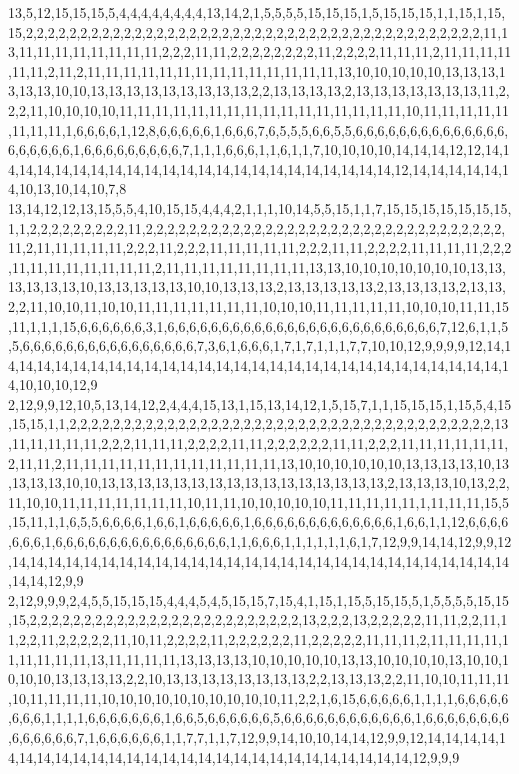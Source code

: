 13,5,12,15,15,15,5,4,4,4,4,4,4,4,4,13,14,2,1,5,5,5,5,15,15,15,1,5,15,15,15,1,1,15,1,15,15,2,2,2,2,2,2,2,2,2,2,2,2,2,2,2,2,2,2,2,2,2,2,2,2,2,2,2,2,2,2,2,2,2,2,2,2,2,2,2,2,2,2,11,13,11,11,11,11,11,11,11,11,2,2,2,11,11,2,2,2,2,2,2,2,2,11,2,2,2,2,11,11,11,2,11,11,11,11,11,11,2,11,2,11,11,11,11,11,11,11,11,11,11,11,11,11,11,13,10,10,10,10,10,13,13,13,13,13,13,10,10,13,13,13,13,13,13,13,13,13,2,2,13,13,13,13,2,13,13,13,13,13,13,13,11,2,2,2,11,10,10,10,10,11,11,11,11,11,11,11,11,11,11,11,11,11,11,11,11,10,11,11,11,11,11,11,11,11,1,6,6,6,6,1,12,8,6,6,6,6,6,1,6,6,6,7,6,5,5,5,6,6,5,5,6,6,6,6,6,6,6,6,6,6,6,6,6,6,6,6,6,6,6,6,1,6,6,6,6,6,6,6,6,6,7,1,1,1,6,6,6,1,1,6,1,1,7,10,10,10,10,14,14,14,12,12,14,14,14,14,14,14,14,14,14,14,14,14,14,14,14,14,14,14,14,14,14,14,14,12,14,14,14,14,14,14,10,13,10,14,10,7,8
13,14,12,12,13,15,5,5,4,10,15,15,4,4,4,2,1,1,1,10,14,5,5,15,1,1,7,15,15,15,15,15,15,15,1,1,2,2,2,2,2,2,2,2,2,11,2,2,2,2,2,2,2,2,2,2,2,2,2,2,2,2,2,2,2,2,2,2,2,2,2,2,2,2,2,2,2,2,2,11,2,11,11,11,11,11,2,2,2,11,2,2,2,11,11,11,11,11,2,2,2,11,11,2,2,2,2,11,11,11,11,2,2,2,11,11,11,11,11,11,11,11,2,11,11,11,11,11,11,11,11,13,13,10,10,10,10,10,10,10,13,13,13,13,13,13,10,13,13,13,13,13,10,10,13,13,13,2,13,13,13,13,13,2,13,13,13,13,2,13,13,2,2,11,10,10,11,10,10,11,11,11,11,11,11,11,10,10,10,11,11,11,11,11,10,10,10,11,11,15,11,1,1,1,15,6,6,6,6,6,6,3,1,6,6,6,6,6,6,6,6,6,6,6,6,6,6,6,6,6,6,6,6,6,6,6,6,6,7,12,6,1,1,5,5,6,6,6,6,6,6,6,6,6,6,6,6,6,6,6,6,7,3,6,1,6,6,6,1,7,1,7,1,1,1,7,7,10,10,12,9,9,9,9,12,14,14,14,14,14,14,14,14,14,14,14,14,14,14,14,14,14,14,14,14,14,14,14,14,14,14,14,14,14,14,10,10,10,12,9
2,12,9,9,12,10,5,13,14,12,2,4,4,4,15,13,1,15,13,14,12,1,5,15,7,1,1,15,15,15,1,15,5,4,15,15,15,1,1,2,2,2,2,2,2,2,2,2,2,2,2,2,2,2,2,2,2,2,2,2,2,2,2,2,2,2,2,2,2,2,2,2,2,2,2,2,2,2,13,11,11,11,11,11,2,2,2,11,11,11,2,2,2,2,11,11,2,2,2,2,2,2,11,11,2,2,2,11,11,11,11,11,11,2,11,11,2,11,11,11,11,11,11,11,11,11,11,11,11,13,10,10,10,10,10,10,13,13,13,13,10,13,13,13,13,10,10,13,13,13,13,13,13,13,13,13,13,13,13,13,13,13,13,2,13,13,13,10,13,2,2,11,10,10,11,11,11,11,11,11,11,10,11,11,10,10,10,10,10,11,11,11,11,11,1,11,11,11,15,5,15,11,1,1,6,5,5,6,6,6,6,1,6,6,1,6,6,6,6,6,1,6,6,6,6,6,6,6,6,6,6,6,6,6,1,6,6,1,1,12,6,6,6,6,6,6,6,1,6,6,6,6,6,6,6,6,6,6,6,6,6,6,6,6,1,1,6,6,6,1,1,1,1,1,1,6,1,7,12,9,9,14,14,12,9,9,12,14,14,14,14,14,14,14,14,14,14,14,14,14,14,14,14,14,14,14,14,14,14,14,14,14,14,14,14,14,14,12,9,9
2,12,9,9,9,2,4,5,5,15,15,15,4,4,4,5,4,5,15,15,7,15,4,1,15,1,15,5,15,15,5,1,5,5,5,5,15,15,15,2,2,2,2,2,2,2,2,2,2,2,2,2,2,2,2,2,2,2,2,2,2,2,2,2,13,2,2,2,13,2,2,2,2,2,11,11,2,2,11,11,2,2,11,2,2,2,2,2,11,10,11,2,2,2,2,11,2,2,2,2,2,2,11,2,2,2,2,2,11,11,11,2,11,11,11,11,11,11,11,11,11,13,11,11,11,11,13,13,13,13,10,10,10,10,10,13,13,10,10,10,10,13,10,10,10,10,10,13,13,13,13,2,2,10,13,13,13,13,13,13,13,13,2,2,13,13,13,2,2,11,10,10,11,11,11,10,11,11,11,11,10,10,10,10,10,10,10,10,10,10,11,2,2,1,6,15,6,6,6,6,6,1,1,1,1,6,6,6,6,6,6,6,6,1,1,1,1,6,6,6,6,6,6,6,1,6,6,5,6,6,6,6,6,6,5,6,6,6,6,6,6,6,6,6,6,6,6,1,6,6,6,6,6,6,6,6,6,6,6,6,6,6,7,1,6,6,6,6,6,6,1,1,7,7,1,1,7,12,9,9,14,10,10,14,14,12,9,9,12,14,14,14,14,14,14,14,14,14,14,14,14,14,14,14,14,14,14,14,14,14,14,14,14,14,14,14,12,9,9,9
